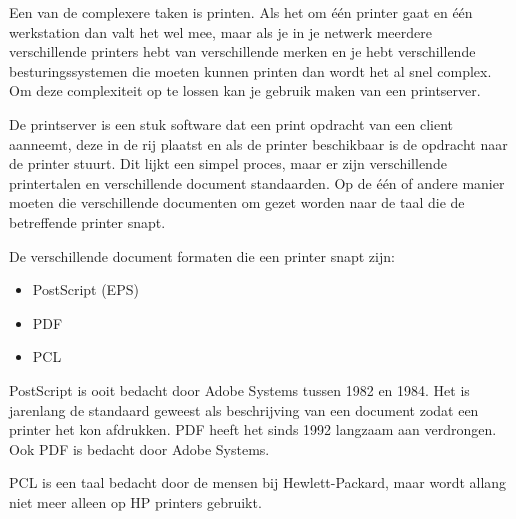 Een van de complexere taken is printen. Als het om \'e\'en printer gaat en \'e\'en werkstation dan valt het wel mee, maar als je in je netwerk meerdere verschillende printers hebt van verschillende merken en je hebt verschillende besturingssystemen die moeten kunnen printen dan wordt het al snel complex. Om deze complexiteit op te lossen kan je gebruik maken van een printserver.

De printserver is een stuk software dat een print opdracht van een client aanneemt, deze in de rij plaatst en als de printer beschikbaar is de opdracht naar de printer stuurt. Dit lijkt een simpel proces, maar er zijn verschillende printertalen en verschillende document standaarden. Op de \'e\'en of andere manier moeten die verschillende documenten om gezet worden naar de taal die de betreffende printer snapt.

De verschillende document formaten die een printer snapt zijn:
\begin{itemize}
\item PostScript (EPS)
\item PDF
\item PCL
\end{itemize}

PostScript\texttrademark{} is ooit bedacht door Adobe Systems tussen 1982 en 1984. Het is jarenlang de standaard geweest als beschrijving van een document zodat een printer het kon afdrukken. PDF heeft het sinds 1992 langzaam aan verdrongen. Ook PDF is bedacht door Adobe Systems.

PCL is een taal bedacht door de mensen bij Hewlett-Packard, maar wordt allang niet meer alleen op HP printers gebruikt.
 
